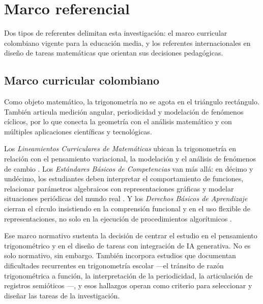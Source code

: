 \section{Marco referencial}
\label{sec:marco_referencial}

Dos tipos de referentes delimitan esta investigación: el marco curricular colombiano vigente para la educación media, y los referentes internacionales en diseño de tareas matemáticas que orientan sus decisiones pedagógicas.

\subsection{Marco curricular colombiano}

Como objeto matemático, la trigonometría no se agota en el triángulo rectángulo. También articula medición angular, periodicidad y modelación de fenómenos cíclicos, por lo que conecta la geometría con el análisis matemático y con múltiples aplicaciones científicas y tecnológicas.

Los \emph{Lineamientos Curriculares de Matemáticas} ubican la trigonometría en relación con el pensamiento variacional, la modelación y el análisis de fenómenos de cambio \parencite{ministeriodeeducacionnacionalLineamientosCurriculares1998}. Los \emph{Estándares Básicos de Competencias} van más allá: en décimo y undécimo, los estudiantes deben interpretar el comportamiento de funciones, relacionar parámetros algebraicos con representaciones gráficas y modelar situaciones periódicas del mundo real \parencite{ministeriodeeducacionnacionalEstandaresBasicos2006}. Y los \emph{Derechos Básicos de Aprendizaje} cierran el círculo insistiendo en la comprensión funcional y en el uso flexible de representaciones, no solo en la ejecución de procedimientos algorítmicos \parencite{ministeriodeeducacionnacionalDerechosBasicos2016}.

Ese marco normativo sustenta la decisión de centrar el estudio en el pensamiento trigonométrico y en el diseño de tareas con integración de IA generativa. No es solo normativo, sin embargo. También incorpora estudios que documentan dificultades recurrentes en trigonometría escolar —el tránsito de razón trigonométrica a función, la interpretación de la periodicidad, la articulación de registros semióticos \parencite{delgadoEstrategiaDidacticaPara2023, chaconComprensionRazonesTrigonometricas2007, zubietaTipificacionErroresDificultades2018}—, y esos hallazgos operan como criterio para seleccionar y diseñar las tareas de la investigación.

